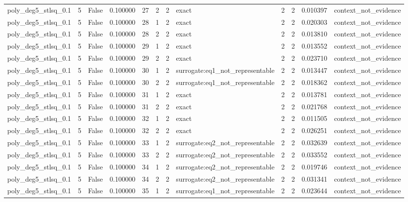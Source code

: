 \begin{tabular}{lrrrrrrlrrrl}
poly\_deg5\_stlsq\_0.1 & 5 & False & 0.100000 & 27 & 2 & 2 & exact & 2 & 2 & 0.010397 & context\_not\_evidence \\
poly\_deg5\_stlsq\_0.1 & 5 & False & 0.100000 & 28 & 1 & 2 & exact & 2 & 2 & 0.020303 & context\_not\_evidence \\
poly\_deg5\_stlsq\_0.1 & 5 & False & 0.100000 & 28 & 2 & 2 & exact & 2 & 2 & 0.013810 & context\_not\_evidence \\
poly\_deg5\_stlsq\_0.1 & 5 & False & 0.100000 & 29 & 1 & 2 & exact & 2 & 2 & 0.013552 & context\_not\_evidence \\
poly\_deg5\_stlsq\_0.1 & 5 & False & 0.100000 & 29 & 2 & 2 & exact & 2 & 2 & 0.023710 & context\_not\_evidence \\
poly\_deg5\_stlsq\_0.1 & 5 & False & 0.100000 & 30 & 1 & 2 & surrogate:eq1\_not\_representable & 2 & 2 & 0.013447 & context\_not\_evidence \\
poly\_deg5\_stlsq\_0.1 & 5 & False & 0.100000 & 30 & 2 & 2 & surrogate:eq1\_not\_representable & 2 & 2 & 0.018362 & context\_not\_evidence \\
poly\_deg5\_stlsq\_0.1 & 5 & False & 0.100000 & 31 & 1 & 2 & exact & 2 & 2 & 0.013781 & context\_not\_evidence \\
poly\_deg5\_stlsq\_0.1 & 5 & False & 0.100000 & 31 & 2 & 2 & exact & 2 & 2 & 0.021768 & context\_not\_evidence \\
poly\_deg5\_stlsq\_0.1 & 5 & False & 0.100000 & 32 & 1 & 2 & exact & 2 & 2 & 0.011505 & context\_not\_evidence \\
poly\_deg5\_stlsq\_0.1 & 5 & False & 0.100000 & 32 & 2 & 2 & exact & 2 & 2 & 0.026251 & context\_not\_evidence \\
poly\_deg5\_stlsq\_0.1 & 5 & False & 0.100000 & 33 & 1 & 2 & surrogate:eq2\_not\_representable & 2 & 2 & 0.032639 & context\_not\_evidence \\
poly\_deg5\_stlsq\_0.1 & 5 & False & 0.100000 & 33 & 2 & 2 & surrogate:eq2\_not\_representable & 2 & 2 & 0.033552 & context\_not\_evidence \\
poly\_deg5\_stlsq\_0.1 & 5 & False & 0.100000 & 34 & 1 & 2 & surrogate:eq2\_not\_representable & 2 & 2 & 0.019746 & context\_not\_evidence \\
poly\_deg5\_stlsq\_0.1 & 5 & False & 0.100000 & 34 & 2 & 2 & surrogate:eq2\_not\_representable & 2 & 2 & 0.031341 & context\_not\_evidence \\
poly\_deg5\_stlsq\_0.1 & 5 & False & 0.100000 & 35 & 1 & 2 & surrogate:eq1\_not\_representable & 2 & 2 & 0.023644 & context\_not\_evidence \\

\end{tabular}
